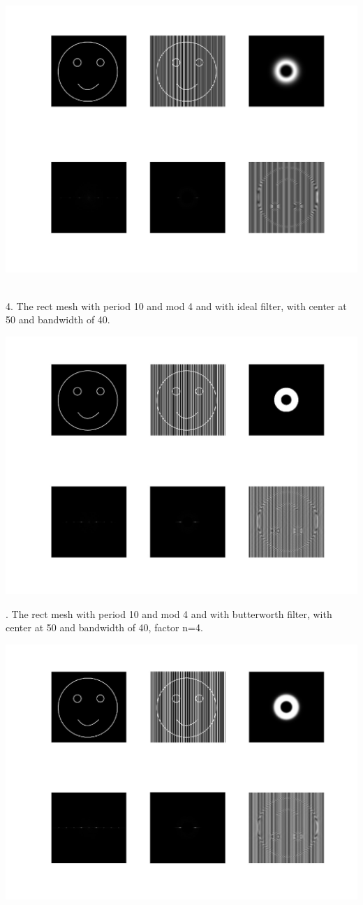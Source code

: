 \documentclass[a4paper]{article}
\begin{document}
\centerline{\includegraphics[scale=0.30]{9.jpg}}\\
4. The rect mesh with period 10 and mod 4 and with ideal filter, with center at 50 and bandwidth of 40.\\
\centerline{\includegraphics[scale=0.30]{10.jpg}}
. The rect mesh with period 10 and mod 4 and with butterworth filter, with center at 50 and bandwidth of 40, factor n=4.\\
\centerline{\includegraphics[scale=0.3]{11.jpg}}\\
\end{document}
